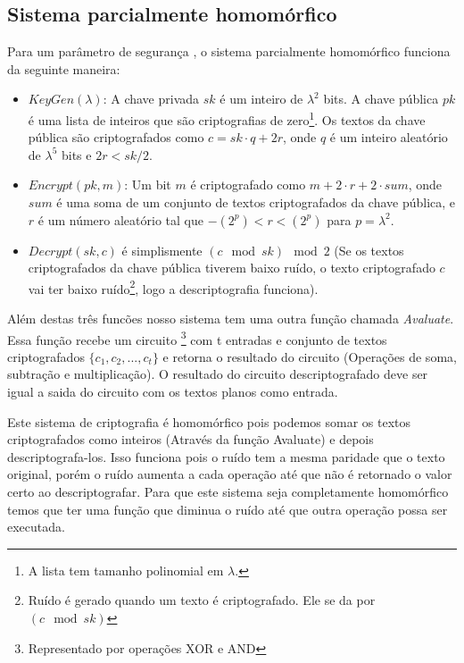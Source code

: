 	\subsection{Sistema parcialmente homomórfico}
	Para um parâmetro de segurança \textlambda, o sistema parcialmente homomórfico funciona da seguinte maneira:
	\begin{itemize}
		\item $KeyGen(\lambda)$: A chave privada $sk$ é um inteiro de $\lambda^2$  bits. A chave pública $pk$ é uma lista de inteiros que são criptografias de zero\footnote{A lista tem tamanho polinomial em $\lambda$.}. Os textos da chave pública são criptografados como $c = sk \cdot q + 2r$, onde $q$ é um inteiro aleatório de $\lambda^5$ bits e $2r < sk/2$.
		\item $Encrypt(pk,m)$: Um bit $m$ é criptografado como $m + 2 \cdot r + 2 \cdot sum$, onde $sum$ é uma soma de um conjunto de textos criptografados da chave pública, e $r$ é um número aleatório tal que $-(2^p) < r < (2^p)$ para $p =  \lambda^2$.
		\item $Decrypt(sk,c)$ é simplismente $(c \mod sk) \mod 2$ (Se os textos criptografados da chave pública tiverem baixo ruído, o texto criptografado $c$ vai ter baixo ruído\footnote{Ruído é gerado quando um texto é criptografado. Ele se da por $(c \mod sk)$}, logo a descriptografia funciona).
	\end{itemize}
	Além destas três funcões nosso sistema tem uma outra função chamada \textit{Avaluate}. Essa função recebe um circuito \footnote{Representado por operações XOR e AND} com t entradas e conjunto de textos criptografados $\lbrace c_1,c_2,...,c_t \rbrace$ e retorna o resultado do circuito (Operações de soma, subtração e multiplicação). O resultado do circuito descriptografado deve ser igual a saida do circuito com os textos planos como entrada.

	Este sistema de criptografia é homomórfico pois podemos somar os textos criptografados como inteiros (Através da função Avaluate) e depois descriptografa-los. Isso funciona pois o ruído tem a mesma paridade que o texto original, porém o ruído aumenta a cada operação até que não é retornado o valor certo ao descriptografar.
Para que este sistema seja completamente homomórfico temos que ter uma função que diminua o ruído até que outra operação possa ser executada.

